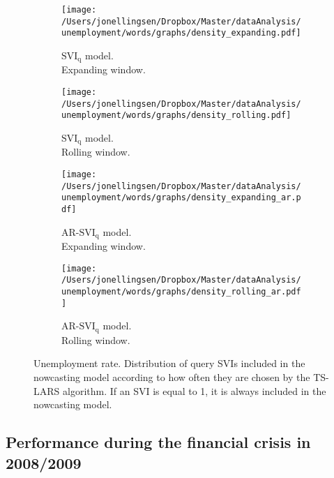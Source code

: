 \begin{figure}[!t]
    \centering
    \begin{subfigure}[b]{0.45\textwidth}
\caption{$\text{SVI}_\text{q}$ model.\\Expanding window.}
\label{density_urate_plain_expanding_queries}
        \texttt{[image: /Users/jonellingsen/Dropbox/Master/dataAnalysis/unemployment/words/graphs/density\_expanding.pdf]}
    \end{subfigure}
    \begin{subfigure}[b]{0.45\textwidth}
\caption{$\text{SVI}_\text{q}$ model.\\Rolling window.}
\label{density_urate_plain_rolling_queries}
        \texttt{[image: /Users/jonellingsen/Dropbox/Master/dataAnalysis/unemployment/words/graphs/density\_rolling.pdf]}
    \end{subfigure}
\begin{subfigure}[b]{0.45\textwidth}
\caption{AR-$\text{SVI}_\text{q}$ model.\\Expanding window.}
\label{density_urate_ar_expanding_queries}       
\texttt{[image: /Users/jonellingsen/Dropbox/Master/dataAnalysis/unemployment/words/graphs/density\_expanding\_ar.pdf]}
    \end{subfigure}
\begin{subfigure}[b]{0.45\textwidth}
\caption{AR-$\text{SVI}_\text{q}$ model.\\Rolling window.}
\label{density_urate_ar_rolling_queries}       
\texttt{[image: /Users/jonellingsen/Dropbox/Master/dataAnalysis/unemployment/words/graphs/density\_rolling\_ar.pdf]}
    \end{subfigure}
\caption{Unemployment rate. Distribution of query SVIs included in the nowcasting model according to how often they are chosen by the TS-LARS algorithm. If an SVI is equal to 1, it is always included in the nowcasting model.}
\label{density_urate_queries}
\end{figure}

\subsection{Performance during the financial crisis in 2008/2009}\label{crisis}

